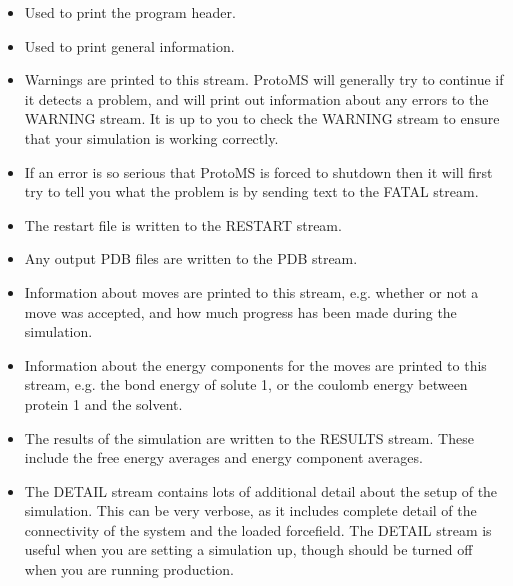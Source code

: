 \documentclass[letterpaper,10pt,english]{sphinxmanual}
\begin{document}
\begin{itemize}
\item {} 
 Used to print the program header.

\item {} 
 Used to print general information.

\item {} 
 Warnings are printed to this stream. ProtoMS will generally try to continue if it detects a problem, and will print out information about any errors to the WARNING stream. It is up to you to check the WARNING stream to ensure that your simulation is working correctly.

\item {} 
 If an error is so serious that ProtoMS is forced to shutdown then it will first try to tell you what the problem is by sending text to the FATAL stream.

\item {} 
 The restart file is written to the RESTART stream.

\item {} 
 Any output PDB files are written to the PDB stream.

\item {} 
 Information about moves are printed to this stream, e.g. whether or not a move was accepted, and how much progress has been made during the simulation.

\item {} 
 Information about the energy components for the moves are printed to this stream, e.g. the bond energy of solute 1, or the coulomb energy between protein 1 and the solvent.

\item {} 
 The results of the simulation are written to the RESULTS stream. These include the free energy averages and energy component averages.

\item {} 
 The DETAIL stream contains lots of additional detail about the setup of the simulation. This can be very verbose, as it includes complete detail of the connectivity of the system and the loaded forcefield. The DETAIL stream is useful when you are setting a simulation up, though should be turned off when you are running production.


\end{itemize}
\end{document}
